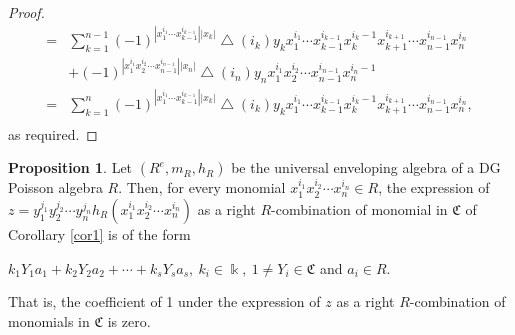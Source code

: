 \documentclass[a4paper,10pt]{amsart}
\theoremstyle{definition}
\newtheorem{prop}[theorem]{Proposition}
\theoremstyle{remark}
\numberwithin{equation}{section}
\begin{document}
\begin{proof}
\begin{equation}
\begin{split}
=&\sum_{k=1}^{n-1}(-1)^{|x_1^{i_1}\cdots x_{k-1}^{i_{k-1}}||x_k|}\bigtriangleup(i_k)y_kx_1^{i_1}\cdots
x_{k-1}^{i_{k-1}}x_k^{i_k-1}x_{k+1}^{i_{k+1}}\cdots x_{n-1}^{i_{n-1}}x_n^{i_n}\\
&+(-1)^{|x_1^{i_1}x_2^{i_2}\cdots x_{n-1}^{i_{n-1}}||x_n|}\bigtriangleup
(i_n)y_nx_1^{i_1}x_2^{i_2}\cdots x_{n-1}^{i_{n-1}}x_n^{i_n-1}\\
=&\sum_{k=1}^{n}(-1)^{|x_1^{i_1}\cdots x_{k-1}^{i_{k-1}}||x_k|}\bigtriangleup(i_k)y_kx_1^{i_1}\cdots
x_{k-1}^{i_{k-1}}x_k^{i_k-1}x_{k+1}^{i_{k+1}}\cdots x_{n-1}^{i_{n-1}}x_n^{i_n},\\
\end{split}\nonumber
\end{equation}
as required.
\end{proof}

\begin{prop}\label{th3}
Let $(R^{e}, m_R, h_R)$ be the universal enveloping algebra of a DG
Poisson algebra $R$. Then, for every
monomial  $x_1^{i_1}x_2^{i_2}\cdots x_n^{i_n}\in R$, the expression of
$z=y_1^{j_1}y_2^{j_2}\cdots y_n^{j_n}h_R(x_1^{i_1}x_2^{i_2}\cdots x_n^{i_n})$
as a right $R$-combination of monomial in $\mathfrak{C}$ of
Corollary \ref{cor1} is of the form
\begin{center}
$k_1Y_1a_1+k_2Y_2a_2+\cdots+k_sY_sa_s, ~k_i\in \Bbbk, ~1\neq
Y_i\in\mathfrak{C}$ and $a_i\in R$.
\end{center}
That is, the coefficient of 1 under the expression of $z$ as a right
$R$-combination of monomials in $\mathfrak{C}$ is zero.
\end{prop}
\end{document}
